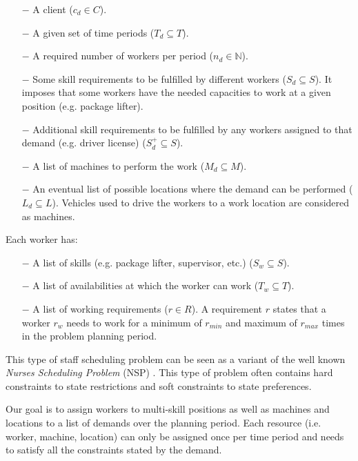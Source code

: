 \documentclass[../thesis.tex]{subfiles}
\begin{document}
\begin{itemize}
  \item[$-$] A client ($c_d \in C$).
  \item[$-$] A given set of time periods ($T_d \subseteq T$).
  \item[$-$] A required number of workers per period ($n_d \in \mathbb{N}$).
  \item[$-$] Some skill requirements to be fulfilled by different workers ($S_d \subseteq S$).
  It imposes that some workers have the needed capacities to work at a given position (e.g. package lifter).
  \item[$-$] Additional skill requirements to be fulfilled by any workers assigned to that demand (e.g. driver license) ($S^{+}_d \subseteq S$).
  \item[$-$] A list of machines to perform the work ($M_d \subseteq M$).
  \item[$-$] An eventual list of possible locations where the demand can be performed ($L_d \subseteq L$).
  Vehicles used to drive the workers to a work location are considered as machines.
\end{itemize}


Each worker has:

\begin{itemize}
  \item[$-$] A list of skills (e.g. package lifter, supervisor, etc.) ($S_w \subseteq S$).
  \item[$-$] A list of availabilities at which the worker can work ($T_w \subseteq T$).  
  \item[$-$] A list of working requirements ($r \in R$). A requirement $r$ states that a worker $r_w$
  needs to work for a minimum of $r_{min}$ and maximum of $r_{max}$ times in the problem planning period.  
\end{itemize}


This type of staff scheduling problem can be seen as a variant of the 
well known \emph{Nurses Scheduling Problem} (NSP) \cite{Burke2004}. 
This type of problem often contains hard constraints to state restrictions 
and soft constraints to state preferences. 




Our goal is to assign workers to multi-skill positions as well as machines and locations to a list of demands over the planning period.
Each resource (i.e. worker, machine, location) can only be assigned once per time period and needs to satisfy all the constraints stated by the demand. 
\end{document}
